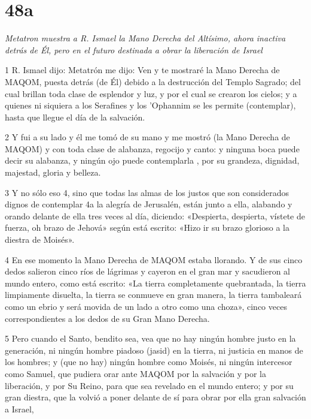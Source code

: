 \chapter{48a}

\par \textit{Metatron muestra a R. Ismael la Mano Derecha del Altísimo, ahora inactiva detrás de Él, pero en el futuro destinada a obrar la liberación de Israel}

\par 1 R. Ismael dijo: Metatrón me dijo: Ven y te mostraré la Mano Derecha de MAQOM, puesta detrás (de Él) debido a la destrucción del Templo Sagrado; del cual brillan toda clase de esplendor y luz, y por el cual se crearon los cielos; y a quienes ni siquiera a los Serafines y los 'Ophannim se les permite (contemplar), hasta que llegue el día de la salvación.

\par 2 Y fui a su lado y él me tomó de su mano y me mostró (la Mano Derecha de MAQOM) y con toda clase de alabanza, regocijo y canto: y ninguna boca puede decir su alabanza, y ningún ojo puede contemplarla , por su grandeza, dignidad, majestad, gloria y belleza.

\par 3 Y no sólo eso 4, sino que todas las almas de los justos que son considerados dignos de contemplar 4a la alegría de Jerusalén, están junto a ella, alabando y orando delante de ella tres veces al día, diciendo: «Despierta, despierta, vístete de fuerza, oh brazo de Jehová» según está escrito: «Hizo ir su brazo glorioso a la diestra de Moisés».

\par 4 En ese momento la Mano Derecha de MAQOM estaba llorando. Y de sus cinco dedos salieron cinco ríos de lágrimas y cayeron en el gran mar y sacudieron al mundo entero, como está escrito: «La tierra completamente quebrantada, la tierra limpiamente disuelta, la tierra se conmueve en gran manera, la tierra tambaleará como un ebrio y será movida de un lado a otro como una choza», cinco veces correspondientes a los dedos de su Gran Mano Derecha.

\par 5 Pero cuando el Santo, bendito sea, vea que no hay ningún hombre justo en la generación, ni ningún hombre piadoso (jasid) en la tierra, ni justicia en manos de los hombres; y (que no hay) ningún hombre como Moisés, ni ningún intercesor como Samuel, que pudiera orar ante MAQOM por la salvación y por la liberación, y por Su Reino, para que sea revelado en el mundo entero; y por su gran diestra, que la volvió a poner delante de sí para obrar por ella gran salvación a Israel,

